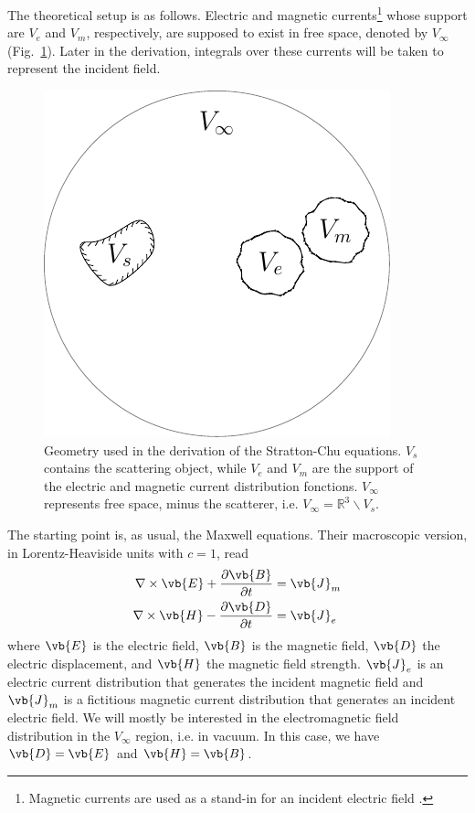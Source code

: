 \documentclass[11pt,SymmetricalJury]{inrsthesis/inrsthesis}
\begin{document}
The theoretical setup is as follows. Electric and magnetic currents\footnote{Magnetic
currents are used as a stand-in for an incident electric field \cite{Schelkunoff1936}.}
whose support are $V_e$ and $V_m$, respectively, are supposed to exist in free
space, denoted by $V_\infty$ (Fig.~\ref{fig:sc.scatteringSystem}). Later in the
derivation, integrals over these currents will be taken to represent the incident
field.

  \begin{figure}
    \centering
    \includegraphics{figs/scatteringSystem.pdf}
    \caption[Geometry used in the derivation of the Stratton-Chu equations.]
            {Geometry used in the derivation of the Stratton-Chu equations.
             $V_s$ contains the scattering object, while $V_e$ and $V_m$ are the
             support of the electric and magnetic current distribution fonctions.
             $V_\infty$ represents free space, minus the scatterer, i.e.
             $V_\infty=\mathbb{R}^3\backslash V_s$.}
    \label{fig:sc.scatteringSystem}
  \end{figure}

The starting point is, as usual, the Maxwell equations. Their macroscopic version,
in Lorentz-Heaviside units with $c=1$, read
  \begin{subequations}
  \begin{align}
    \nabla\times\vb{E} + \frac{\partial\vb{B}}{\partial t}  &= \vb{J}_m \\
    \nabla\times\vb{H} - \frac{\partial\vb{D}}{\partial t}  &= \vb{J}_e
  \end{align}
  \end{subequations}
where $\vb{E}$ is the electric field, $\vb{B}$ is the magnetic field,
$\vb{D}$ the electric displacement, and $\vb{H}$ the magnetic field strength.
$\vb{J}_e$ is an electric current distribution that generates the incident
magnetic field and $\vb{J}_m$ is a fictitious magnetic current distribution
that generates an incident electric field. We will mostly be interested
in the electromagnetic field distribution in the $V_\infty$ region, i.e.
in vacuum. In this case, we have $\vb{D}=\vb{E}$ and $\vb{H}=\vb{B}$.
\end{document}
